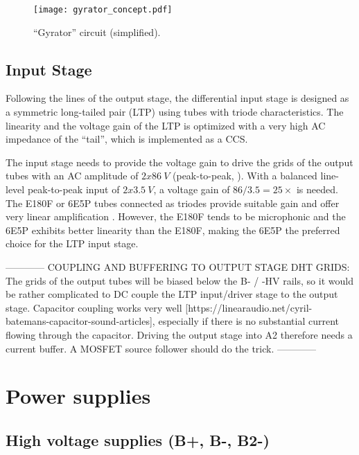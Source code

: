 \begin{figure}
\begin{center}
\texttt{[image: gyrator\_concept.pdf]}
\caption{``Gyrator'' circuit (simplified).}
\end{center}
\end{figure}

\subsection{Input Stage}

Following the lines of the output stage, the differential input stage is designed as a symmetric long-tailed pair (LTP)\cite{valvewizard_LTP} using tubes with triode characteristics. The linearity and the voltage gain of the LTP is optimized with a very high AC impedance of the ``tail'', which is implemented as a CCS.

The input stage needs to provide the voltage gain to drive the grids of the output tubes with an AC amplitude of $2 x \SI{86}{V}$ (peak-to-peak, ). With a balanced line-level peak-to-peak input of $2 x \SI{3.5}{V}$, a voltage gain of $86 / 3.5 = 25\times$ is needed. The E180F or 6E5P tubes connected as triodes provide suitable gain and offer very linear amplification \cite{bartola_thdbenchmark,millett_pentodes,klausmobile_testerfiles}. However, the E180F tends to be microphonic\cite{osdeha_p23} and the 6E5P exhibits better linearity than the E180F\cite{osdeha_p32}, making the 6E5P the preferred choice for the LTP input stage.



------------
COUPLING AND BUFFERING TO OUTPUT STAGE DHT GRIDS: The grids of the output tubes will be biased below the B- / -HV rails, so it would be rather complicated to DC couple the LTP input/driver stage to the output stage. Capacitor coupling works very well [https://linearaudio.net/cyril-batemans-capacitor-sound-articles], especially if there is no substantial current flowing through the capacitor. Driving the output stage into A2 therefore needs a current buffer. A MOSFET source follower should do the trick.
------------


\section{Power supplies}

\subsection{High voltage supplies (B+, B-, B2-)}

